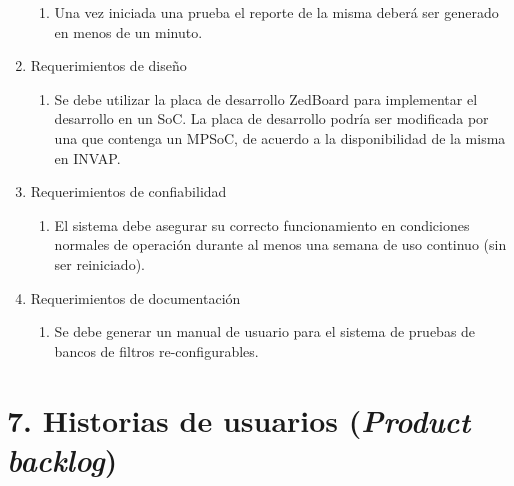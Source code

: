 \documentclass[
11pt, %
]{charter}
\begin{document}
\begin{enumerate}
\begin{enumerate}
		\item Una vez iniciada una prueba el reporte de la misma deberá ser generado en menos de un minuto.
	\end{enumerate}
	\item Requerimientos de diseño
	\begin{enumerate}
		\item Se debe utilizar la placa de desarrollo ZedBoard para implementar el desarrollo en un SoC. La placa de desarrollo podría ser modificada por una que contenga un MPSoC, de acuerdo a la disponibilidad de la misma en INVAP.
	\end{enumerate}
	\item Requerimientos de confiabilidad 
	\begin{enumerate}
		\item El sistema debe asegurar su correcto funcionamiento en condiciones normales de operación durante al menos una semana de uso continuo (sin ser reiniciado).
	\end{enumerate}
	\item Requerimientos de documentación
	\begin{enumerate}
		\item Se debe generar un manual de usuario para el sistema de pruebas de bancos de filtros re-configurables.
	\end{enumerate}
\end{enumerate}

\section{7. Historias de usuarios (\textit{Product backlog})}
\label{sec:backlog}
\end{document}

